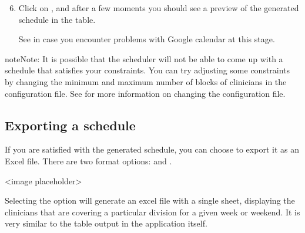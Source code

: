 \documentclass[letterpaper,10pt,english]{sphinxmanual}
\begin{document}
\begin{figure}[h!]
\centering
{}\end{figure}
\begin{enumerate}
\setcounter{enumi}{5}
\item {} 
Click on , and after a few moments you should see a preview of
the generated schedule in the table.

 See {\hyperref[\detokenize{index:authentication}]{}} in case you encounter problems
with Google calendar at this stage.

\end{enumerate}

\begin{figure}[h!]
\centering
{}\end{figure}

\begin{sphinxadmonition}{note}{Note:}
It is possible that the scheduler will not be able to come up with a
schedule that satisfies your constraints. You can try adjusting
some constraints by changing the minimum and maximum number of blocks of
clinicians in the configuration file. See {\hyperref[\detokenize{index:clinician-configuration}]{}}
for more information on changing the configuration file.
\end{sphinxadmonition}


\subsection{Exporting a schedule}
\label{\detokenize{index:exporting-a-schedule}}
If you are satisfied with the generated schedule, you can choose to export
it as an Excel file. There are two format options:  and
.

\textless{}image placeholder\textgreater{}

Selecting the  option will generate an excel file with a single
sheet, displaying the clinicians that are covering a particular division
for a given week or weekend. It is very similar to the table output in
the application itself.
\end{document}
